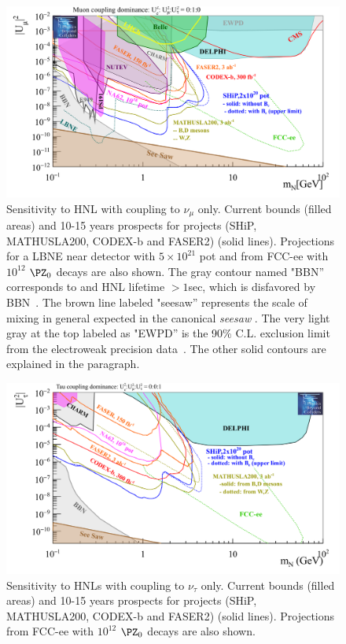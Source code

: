\begin{figure}[h]
  \centering
  \includegraphics[width=.90\textwidth]{Figures/c3/HNL_bc7_pbc_2.png}
    \caption{Sensitivity to HNL with coupling to $\nu_\mu$ only. Current bounds (filled areas) and 10-15 years prospects for projects
(SHiP, MATHUSLA200, CODEX-b and FASER2) (solid lines). Projections for a LBNE
near detector with $5\times 10^{21}$ pot and from FCC-ee with $10^{12}$ $\PZ_0$ decays are also shown. The gray contour named "BBN'' corresponds to and HNL lifetime $>1$sec,
which is disfavored by BBN~\cite{Ruchayskiy_2012}. The brown line
labeled "seesaw'' represents the scale of mixing in general expected
in the canonical \emph{seesaw }. The very light gray at the top
labeled as "EWPD'' is the 90\% C.L. exclusion limit from the
electroweak precision data~\cite{Antusch_2015}. The other solid
contours are explained in the paragraph.}
  \label{fig:HNL_bc7_pbc_2}
\end{figure}

\begin{figure}[h]
  \centering
  \includegraphics[width=.90\textwidth]{Figures/c3/HNL_bc8_pbc_2.png}
    \caption{Sensitivity to HNLs with coupling to $\nu_\tau$ only. Current bounds (filled areas) and 10-15 years prospects for projects
(SHiP, MATHUSLA200, CODEX-b and FASER2) (solid lines). Projections from FCC-ee with $10^{12}$ $\PZ_0$ decays are also shown.}
  \label{fig:HNL_bc8_pbc_2}
\end{figure}

